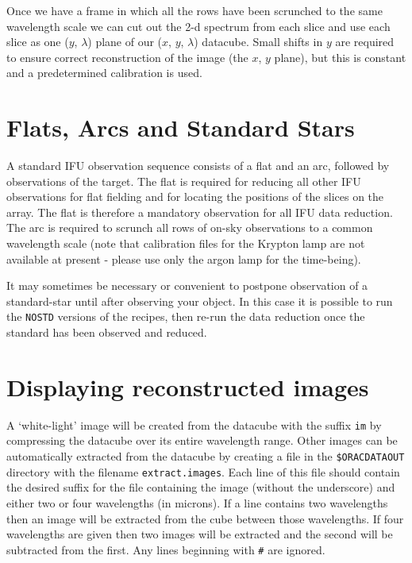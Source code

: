 \documentclass[twoside,11pt]{article}
\renewcommand{\_}{\texttt{\symbol{95}}}
\begin{document}
Once we have a frame in which all the rows have been scrunched to the
same wavelength scale we can cut out the 2-d spectrum from each slice
and use each slice as one ($y$, $\lambda$) plane of our ($x$,
$y$, $\lambda$) datacube. Small shifts in $y$ are required to ensure correct
reconstruction of the image (the $x$, $y$ plane), but this is constant
and a predetermined calibration is used.


\section{Flats, Arcs and Standard Stars}

A standard IFU observation sequence consists of a flat and an arc,
followed by observations of the target. The flat is required for
reducing all other IFU observations for flat fielding and for locating
the positions of the slices on the array. The flat is therefore a
mandatory observation for all IFU data reduction. The arc is required
to scrunch all rows of on-sky observations to a common wavelength
scale (note that calibration files for the Krypton lamp are not
available at present - please use only the argon lamp for the
time-being).

It may sometimes be necessary or convenient to postpone observation of
a standard-star until after observing your object. In this case it is
possible to run the {\tt \_NOSTD} versions of the recipes, then re-run the
data reduction once the standard has been observed and reduced.



\section{Displaying reconstructed images}


A `white-light' image will be created from the datacube with the
suffix {\tt \_im} by compressing the datacube over its entire
wavelength range. Other images can be automatically extracted from the
datacube by creating a file in the {\tt \$ORAC\_DATA\_OUT} directory
with the filename {\tt extract.images}. Each line of this file should
contain the desired suffix for the file containing the image (without
the underscore) and either two or four wavelengths (in microns). If a
line contains two wavelengths then an image will be extracted from the
cube between those wavelengths. If four wavelengths are given then two
images will be extracted and the second will be subtracted from the
first. Any lines beginning with {\tt \#} are ignored.
\end{document}
